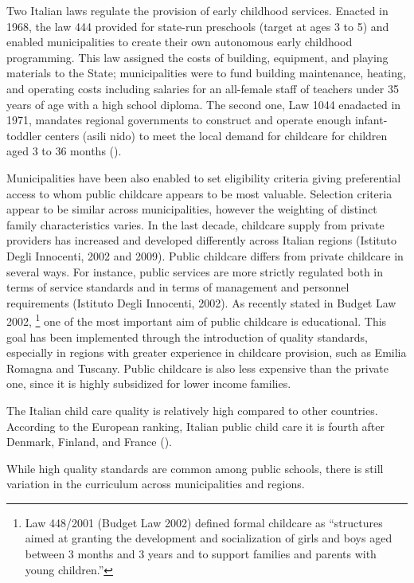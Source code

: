 \documentclass[12pt]{article}
\begin{document}
Two Italian laws regulate the provision of early childhood services. Enacted
in 1968, the law 444 provided for state-run preschools (target at ages 3 to
5) and enabled municipalities to create their own autonomous early childhood
programming. This law assigned the costs of building, equipment, and playing
materials to the State; municipalities were to fund building maintenance,
heating, and operating costs including salaries for an all-female staff of
teachers under 35 years of age with a high school diploma. The second one,
Law 1044 enadacted in 1971, mandates regional governments to construct and
operate enough infant-toddler centers (asili nido) to meet the local demand
for childcare for children aged 3 to 36 months (\cite{Brilli2016}).

Municipalities have been also enabled to set eligibility criteria giving
preferential access to whom public childcare appears to be most valuable.
Selection criteria appear to be similar across municipalities, however the
weighting of distinct family characteristics varies. In the last decade,
childcare supply from private providers has increased and developed
differently across Italian regions (Istituto Degli Innocenti, 2002 and
2009). Public childcare differs from private childcare in several ways. For
instance, public services are more strictly regulated both in terms of
service standards and in terms of management and personnel requirements
(Istituto Degli Innocenti, 2002). As recently stated in Budget Law 2002,%
\footnote{%
Law 448/2001 (Budget Law 2002) defined formal childcare as ``structures
aimed at granting the development and socialization of girls and boys aged
between 3 months and 3 years and to support families and parents with young
children.''} one of the most important aim of public childcare is
educational. This goal has been implemented through the introduction of
quality standards, especially in regions with greater experience in
childcare provision, such as Emilia Romagna and Tuscany. Public childcare is
also less expensive than the private one, since it is highly subsidized for
lower income families.

The Italian child care quality is relatively high compared to other
countries. According to the European ranking, Italian public child care it
is fourth after Denmark, Finland, and France (\cite{DeHenau2008}).

While high quality standards are common among public schools, there is still
variation in the curriculum across municipalities and regions.
\end{document}
